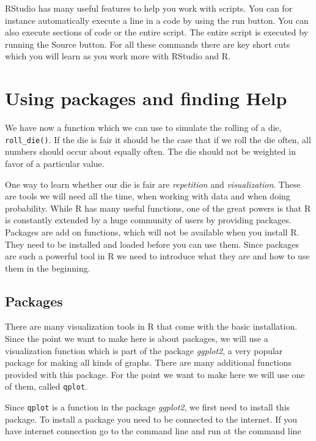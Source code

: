 \documentclass[
]{book}
\begin{document}
RStudio has many useful features to help you work with scripts. You can for instance automatically
execute a line in a code by using the run button. You can also execute sections of code or the
entire script. The entire script is executed by running the Source button. For all these commands
there are key short cuts which you will learn as you work more with RStudio and R.

\hypertarget{using-packages-and-finding-help}{%
\section{Using packages and finding Help}\label{using-packages-and-finding-help}}

We have now a function which we can use to simulate the rolling of a die, \texttt{roll\_die()}. If the
die is fair it should be the case that if we roll the die often, all numbers should occur
about equally often. The die should not be weighted in favor of a particular value.

One way to learn whether our die is fair are \emph{repetition} and \emph{visualization}. These
are tools we will need all the time, when working with data and when doing probability.
While R has many useful functions, one of the great powers is that R is constantly extended
by a huge community of users by providing packages. Packages are add on functions, which will
not be available when you install R. They need to be installed and loaded before you can use them.
Since packages are such a powerful tool in R we need to introduce what they are and how to use
them in the beginning.

\hypertarget{packages}{%
\subsection{Packages}\label{packages}}

There are many visualization tools in R that come with the basic installation. Since the point
we want to make here is about packages, we will use a visualization function which is part of
the package \emph{ggplot2}, a very popular package for making all kinds of graphs. There are
many additional functions provided with this package. For the point we want to make here
we will use one of them, called \texttt{qplot}.

Since \texttt{qplot} is a function in the package \emph{ggplot2}, we first need to install this package.
To install a package you need to be connected to the internet. If you have internet connection
go to the command line and run at the command line
\end{document}
